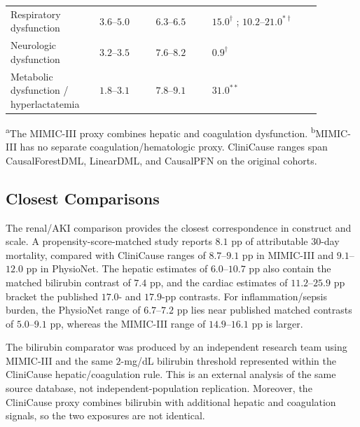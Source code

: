 \documentclass[letterpaper,10pt]{article}
\begin{document}
\begin{table}[H]
\begin{tabular}{p{0.25\linewidth}p{0.16\linewidth}p{0.16\linewidth}p{0.31\linewidth}}
Respiratory dysfunction &
\(3.6\)--\(5.0\) &
\(6.3\)--\(6.5\) &
\(15.0^{\dagger}\) \cite{torres2021ards};
\(10.2\)--\(21.0^{*\dagger}\) \cite{saha2023ards} \\
\addlinespace

Neurologic dysfunction &
\(3.2\)--\(3.5\) &
\(7.6\)--\(8.2\) &
\(0.9^{\dagger}\) \cite{kleinklouwenberg2014delirium} \\
\addlinespace

Metabolic dysfunction / hyperlactatemia &
\(1.8\)--\(3.1\) &
\(7.8\)--\(9.1\) &
\(31.0^{**}\) \cite{gunnerson2006acidosis} \\
\bottomrule
\end{tabular}

\vspace{2pt}
\begin{minipage}{0.94\linewidth}
\scriptsize
\textsuperscript{a}The MIMIC-III proxy combines hepatic and coagulation
dysfunction.
\textsuperscript{b}MIMIC-III has no separate coagulation/hematologic proxy.
CliniCause ranges span CausalForestDML, LinearDML, and CausalPFN on the
original cohorts.
\end{minipage}
\end{table}

\subsection{Closest Comparisons}

The renal/AKI comparison provides the closest correspondence in construct and
scale.  A propensity-score-matched study reports \(8.1\) pp of attributable
30-day mortality, compared with CliniCause ranges of \(8.7\)--\(9.1\) pp in
MIMIC-III and \(9.1\)--\(12.0\) pp in PhysioNet.  The hepatic estimates of
\(6.0\)--\(10.7\) pp also contain the matched bilirubin contrast of \(7.4\) pp,
and the cardiac estimates of \(11.2\)--\(25.9\) pp bracket the published
\(17.0\)- and \(17.9\)-pp contrasts.  For inflammation/sepsis burden, the
PhysioNet range of \(6.7\)--\(7.2\) pp lies near published matched contrasts of
\(5.0\)--\(9.1\) pp, whereas the MIMIC-III range of \(14.9\)--\(16.1\) pp is
larger.

The bilirubin comparator was produced by an independent research team using
MIMIC-III and the same \(2\)-mg/dL bilirubin threshold represented within the
CliniCause hepatic/coagulation rule.  This is an external analysis of the same
source database, not independent-population replication.  Moreover, the
CliniCause proxy combines bilirubin with additional hepatic and coagulation
signals, so the two exposures are not identical.
\end{document}
